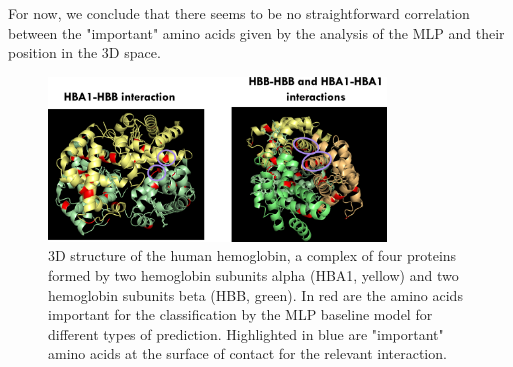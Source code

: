 \documentclass[11pt,a4paper]{article}
\begin{document}
For now, we conclude that there seems to be no straightforward correlation between the "important" amino acids given by the analysis of the MLP and their position in the 3D space.

\begin{figure}[ht]
\centering
\includegraphics[width=0.8\textwidth]{images/struct_HBB_HBA1.png}
\caption{3D structure of the human hemoglobin, a complex of four proteins formed by two hemoglobin subunits alpha (HBA1, yellow) and two hemoglobin subunits beta (HBB, green). In red are the amino acids important for the classification by the MLP baseline model for different types of prediction. Highlighted in blue are "important" amino acids at the surface of contact for the relevant interaction.}
\label{3D_HBB_HBA1_complex}
\end{figure}



\pagebreak
\FloatBarrier


\end{document}
